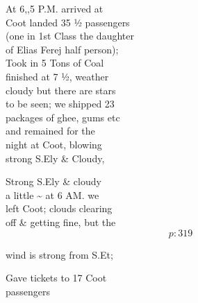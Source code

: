 \documentclass{report}
\begin{document}
	\par{
 	At 6,,5 P.M. arrived at\ \\Coot landed 35 ½ passengers\ \\(one in 1st Class the daughter\ \\of Elias Ferej half person);\ \\Took in 5 Tons of Coal\ \\finished at 7 ½, weather\ \\cloudy but there are stars\ \\to be seen; we shipped 23\ \\packages of ghee, gums etc\ \\and remained for the\ \\night at Coot, blowing\ \\strong S.Ely \& Cloudy,\ \\
	}

	\par{
 	Strong S.Ely \& cloudy\ \\a little \~{} at 6 AM. we\ \\left Coot; clouds clearing\ \\off \& getting fine, but the\ \\
  \[p: 319 \]

	}




	\par{
 	wind is strong from S.Et;\ \\
	}

	\par{
 	Gave tickets to 17 Coot\ \\passengers\ \\
	}
\end{document}
